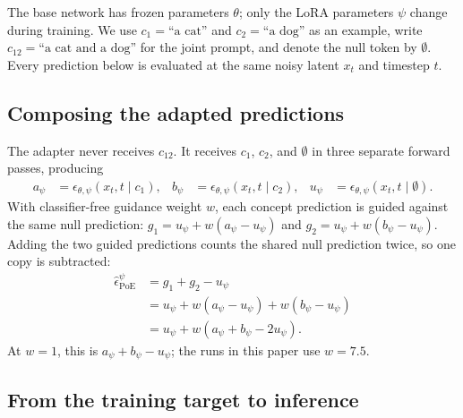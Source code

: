 \documentclass{article} %
\begin{document}
The base network has frozen parameters $\theta$; only the LoRA parameters $\psi$ change during
training. We use $c_1=\text{``a cat''}$ and $c_2=\text{``a dog''}$ as an example, write
$c_{12}=\text{``a cat and a dog''}$ for the joint prompt, and denote the null token by
$\emptyset$. Every prediction below is evaluated at the same noisy latent $x_t$ and timestep $t$.

\subsection{Composing the adapted predictions}

The adapter never receives $c_{12}$. It receives $c_1$, $c_2$, and $\emptyset$ in three
separate forward passes, producing
\begin{equation}
\begin{aligned}
a_\psi &= \epsilon_{\theta,\psi}(x_t,t\mid c_1), &
 b_\psi &= \epsilon_{\theta,\psi}(x_t,t\mid c_2), &
 u_\psi &= \epsilon_{\theta,\psi}(x_t,t\mid\emptyset).
\end{aligned}
\label{eq:adapted-predictions}
\end{equation}
With classifier-free guidance weight $w$, each concept prediction is guided against the same
null prediction: $g_1=u_\psi+w(a_\psi-u_\psi)$ and
$g_2=u_\psi+w(b_\psi-u_\psi)$. Adding the two guided predictions counts the shared null
prediction twice, so one copy is subtracted:
\begin{align}
\hat\epsilon^{\psi}_{\mathrm{PoE}}
 &= g_1+g_2-u_\psi \nonumber\\
 &= u_\psi+w(a_\psi-u_\psi)+w(b_\psi-u_\psi) \nonumber\\
 &= u_\psi+w(a_\psi+b_\psi-2u_\psi).
\label{eq:adapted-poe}
\end{align}
At $w=1$, this is $a_\psi+b_\psi-u_\psi$; the runs in this paper use $w=7.5$.

\subsection{From the training target to inference}
\end{document}

